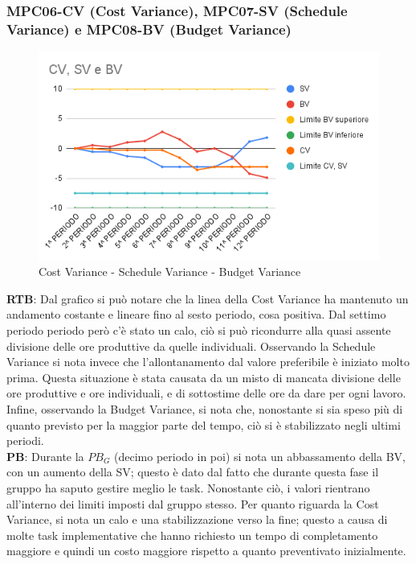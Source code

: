 \subsubsection{MPC06-CV (Cost Variance), MPC07-SV (Schedule Variance) e MPC08-BV (Budget Variance)}
\begin{figure}[H]
  \centering
  \includegraphics[width=0.7\linewidth]{grafici/CV, SV e BV.png}
  \caption{Cost Variance - Schedule Variance - Budget Variance}
\end{figure}
\textbf{RTB}: Dal grafico si può notare che la linea della Cost Variance ha mantenuto un andamento costante e lineare fino al sesto periodo, cosa positiva. Dal settimo periodo periodo però c'è stato un calo, ciò si può ricondurre alla quasi assente divisione delle ore produttive da quelle individuali. Osservando la Schedule Variance si nota invece che l'allontanamento dal valore preferibile è iniziato molto prima. Questa situazione è stata causata da un misto di mancata divisione delle ore produttive e ore individuali, e di sottostime delle ore da dare per ogni lavoro. Infine, osservando la Budget Variance, si nota che, nonostante si sia speso più di quanto previsto per la maggior parte del tempo, ciò si è stabilizzato negli ultimi periodi.\\
\textbf{PB}: Durante la $\textit{PB}_G$ (decimo periodo in poi) si nota un abbassamento della BV, con un aumento della SV; questo è dato dal fatto che durante questa fase il gruppo ha saputo gestire meglio le task. Nonostante ciò, i valori rientrano all'interno dei limiti imposti dal gruppo stesso. Per quanto riguarda la Cost Variance, si nota un calo e una stabilizzazione verso la fine; questo a causa di molte task implementative che hanno richiesto un tempo di completamento maggiore e quindi un costo maggiore rispetto a quanto preventivato inizialmente.
